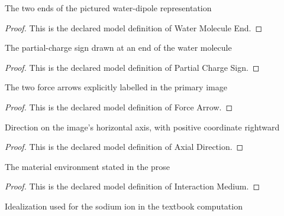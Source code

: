 \begin{definition}
  \label{def:physics:phyx-mini-0911:phyxminiproblems-problemphyxmini0911-watermoleculeend}
  The two ends of the pictured water-dipole representation
\end{definition}
\begin{proof}
  This is the declared model definition of Water Molecule End.
\end{proof}
\begin{definition}
  \label{def:physics:phyx-mini-0911:phyxminiproblems-problemphyxmini0911-partialchargesign}
  The partial-charge sign drawn at an end of the water molecule
\end{definition}
\begin{proof}
  This is the declared model definition of Partial Charge Sign.
\end{proof}
\begin{definition}
  \label{def:physics:phyx-mini-0911:phyxminiproblems-problemphyxmini0911-forcearrow}
  The two force arrows explicitly labelled in the primary image
\end{definition}
\begin{proof}
  This is the declared model definition of Force Arrow.
\end{proof}
\begin{definition}
  \label{def:physics:phyx-mini-0911:phyxminiproblems-problemphyxmini0911-axialdirection}
  Direction on the image's horizontal axis, with positive coordinate rightward
\end{definition}
\begin{proof}
  This is the declared model definition of Axial Direction.
\end{proof}
\begin{definition}
  \label{def:physics:phyx-mini-0911:phyxminiproblems-problemphyxmini0911-interactionmedium}
  The material environment stated in the prose
\end{definition}
\begin{proof}
  This is the declared model definition of Interaction Medium.
\end{proof}
\begin{definition}
  \label{def:physics:phyx-mini-0911:phyxminiproblems-problemphyxmini0911-ionmodel}
  Idealization used for the sodium ion in the textbook computation
\end{definition}
